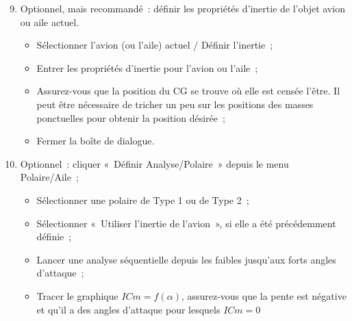 \documentclass[a4paper,twoside,12pt,dvips]{article}
\begin{document}
\begin{enumerate}
	\setcounter{enumi}{8}
	\item Optionnel, mais recommandé~: définir les propriétés d’inertie de 
	l’objet avion ou aile actuel.

	\begin{itemize}
		\item Sélectionner l’avion (ou l’aile) actuel / Définir l’inertie~;
		\item Entrer les propriétés d’inertie pour l’avion ou l’aile~;
		\item Assurez-vous que la position du CG se trouve où elle est censée 
		l’être. Il peut être nécessaire de tricher un peu sur les positions des
		masses ponctuelles pour obtenir la position désirée~;
		\item Fermer la boîte de dialogue.
	\end{itemize}
	
	\item Optionnel~: cliquer «~Définir Analyse/Polaire~» depuis le menu 
	Polaire/Aile~;

	\begin{itemize}
		\item Sélectionner une polaire de Type 1 ou de Type 2~;
		\item Sélectionner «~Utiliser l’inertie de l’avion~», si elle a été 
		précédemment définie~;
		\item Lancer une analyse séquentielle depuis les faibles jusqu’aux forts
		angles d’attaque~;
		\item Tracer le graphique $ICm=f(\alpha)$, assurez-vous que la pente est
		 négative et qu’il a des angles d’attaque pour lesquels $ICm=0$
	\end{itemize}


\end{enumerate}
\end{document}
